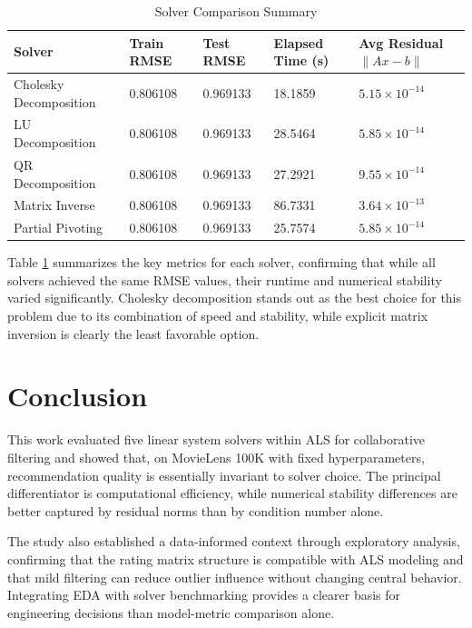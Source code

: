\documentclass[12pt,a4paper]{report}
\begin{document}
\begin{table}[h]
\centering
\caption{Solver Comparison Summary}
\label{tab:solver-comparison}
\begin{tabularx}{\linewidth}{XXXXX}
\toprule
\textbf{Solver} & \textbf{Train RMSE} & \textbf{Test RMSE} & \textbf{Elapsed Time (s)} & \textbf{Avg Residual $\|Ax-b\|$}\\
\midrule
Cholesky Decomposition & 0.806108 & 0.969133 & 18.1859 & $5.15 \times 10^{-14}$  \\
LU Decomposition       & 0.806108 & 0.969133 & 28.5464 & $5.85 \times 10^{-14}$  \\
QR Decomposition       & 0.806108 & 0.969133 & 27.2921 & $9.55 \times 10^{-14}$  \\
Matrix Inverse         & 0.806108 & 0.969133 & 86.7331 & $3.64 \times 10^{-13}$  \\
Partial Pivoting       & 0.806108 & 0.969133 & 25.7574 & $5.85 \times 10^{-14}$  \\
\bottomrule
\end{tabularx}
\end{table}

Table \ref{tab:solver-comparison} summarizes the key metrics for each solver, confirming that while all solvers achieved the same RMSE values, their runtime and numerical stability varied significantly. Cholesky decomposition stands out as the best choice for this problem due to its combination of speed and stability, while explicit matrix inversion is clearly the least favorable option.

\vspace{4em}

\chapter*{Conclusion}
This work evaluated five linear system solvers within ALS for collaborative filtering and showed that, on MovieLens 100K with fixed hyperparameters, recommendation quality is essentially invariant to solver choice. The principal differentiator is computational efficiency, while numerical stability differences are better captured by residual norms than by condition number alone.

The study also established a data-informed context through exploratory analysis, confirming that the rating matrix structure is compatible with ALS modeling and that mild filtering can reduce outlier influence without changing central behavior. Integrating EDA with solver benchmarking provides a clearer basis for engineering decisions than model-metric comparison alone.
\end{document}
